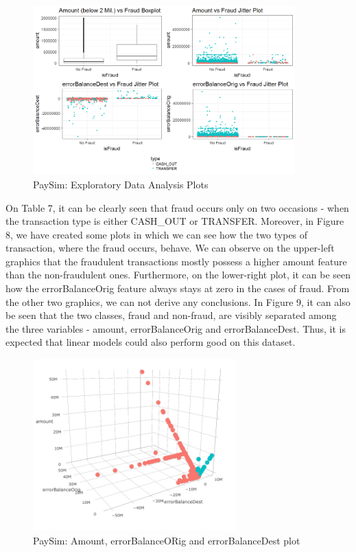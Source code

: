 \documentclass[12pt,]{article}
\begin{document}
\begin{figure}
\centering
\includegraphics[width=0.9\textwidth,height=\textheight]{figures/paySim/descriptive/four_plots.png}
\caption{PaySim: Exploratory Data Analysis Plots}
\end{figure}

On Table 7, it can be clearly seen that fraud occurs only on two
occasions - when the transaction type is either CASH\_OUT or TRANSFER.
Moreover, in Figure 8, we have created some plots in which we can see
how the two types of transaction, where the fraud occurs, behave. We can
observe on the upper-left graphics that the fraudulent transactions
mostly possess a higher amount feature than the non-fraudulent ones.
Furthermore, on the lower-right plot, it can be seen how the
errorBalanceOrig feature always stays at zero in the cases of fraud.
From the other two graphics, we can not derive any conclusions. In
Figure 9, it can also be seen that the two classes, fraud and non-fraud,
are visibly separated among the three variables - amount,
errorBalanceOrig and errorBalanceDest. Thus, it is expected that linear
models could also perform good on this dataset.

\begin{figure}
\centering
\includegraphics[width=0.7\textwidth,height=\textheight]{figures/paySim/descriptive/threedimensionalplot.png}
\caption{PaySim: Amount, errorBalanceORig and errorBalanceDest plot}
\end{figure}
\end{document}
